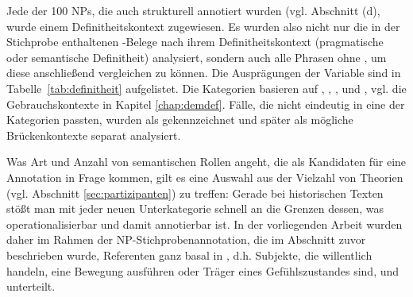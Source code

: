 Jede der 100 NPs, die auch strukturell annotiert wurden (vgl. Abschnitt (d), wurde einem Definitheitskontext zugewiesen. Es wurden also nicht nur die in der Stichprobe enthaltenen -Belege nach ihrem Definitheitskontext (pragmatische oder semantische Definitheit) analysiert, sondern auch alle Phrasen ohne , um diese anschließend vergleichen zu können. Die Ausprägungen der Variable  sind in Tabelle~\ref{tab:definitheit} aufgelistet. Die Kategorien basieren auf \textcite{Lobner1985}, \textcite{Himmelmann1996, Himmelmann1997},  \textcite{Diessel1999}, \textcite{Donhauser2012} und \textcite{Szczepaniak2011a}, vgl. die Gebrauchskontexte in Kapitel \ref{chap:demdef}. Fälle, die nicht eindeutig in eine der Kategorien passten, wurden als  gekennzeichnet und später als mögliche Brückenkontexte separat analysiert. 

Was Art und Anzahl von semantischen Rollen angeht, die als Kandidaten für eine Annotation in Frage kommen, gilt es eine Auswahl aus der Vielzahl von Theorien (vgl. Abschnitt \ref{sec:partizipanten}) zu treffen: Gerade bei historischen Texten stößt man mit jeder neuen Unterkategorie schnell an die Grenzen dessen, was operationalisierbar und damit annotierbar ist. In der vorliegenden Arbeit wurden daher im Rahmen der NP-Stichprobenannotation, die im Abschnitt zuvor beschrieben wurde, Referenten ganz basal in , d.h. Subjekte, die willentlich handeln,  eine Bewegung ausführen oder Träger eines Gefühlszustandes sind,  und  unterteilt.


